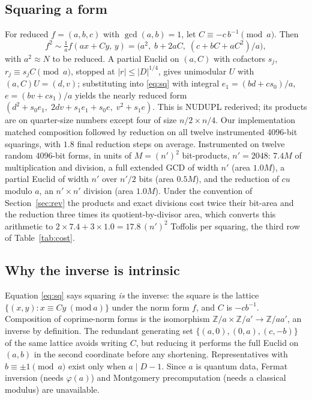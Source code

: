 \documentclass[runningheads]{llncs}
\newcommand{\Z}{\mathbb{Z}}
\begin{document}
\subsection{Squaring a form}
For reduced $f=(a,b,c)$ with $\gcd(a,b)=1$, let $C\equiv-c\,b^{-1}\pmod a$. Then
\begin{equation}\label{eq:sq}
f^2\sim\tfrac1a f(ax+Cy,\,y)=\big(a^2,\;b+2aC,\;(c+bC+aC^2)/a\big),
\end{equation}
with $a^2\approx N$ to be reduced. A partial Euclid on $(a,C)$ with cofactors $s_j$, $r_j\equiv s_jC\pmod a$, stopped at $|r|\le|D|^{1/4}$, gives unimodular $U$ with $(a,C)U=(d,v)$; substituting into \eqref{eq:sq} with integral $e_1=(bd+cs_0)/a$, $e=(bv+cs_1)/a$ yields the nearly reduced form $(d^2+s_0e_1,\;2dv+s_1e_1+s_0e,\;v^2+s_1e)$. This is NUDUPL \cite{jacobson2002} rederived; its products are on quarter-size numbers except four of size $n/2\times n/4$. Our implementation matched composition followed by reduction on all twelve instrumented 4096-bit squarings, with $1.8$ final reduction steps on average. Instrumented on twelve random 4096-bit forms, in units of $M=(n')^2$ bit-products, $n'=2048$: $7.4M$ of multiplication and division, a full extended GCD of width $n'$ (area $1.0M$), a partial Euclid of width $n'$ over $n'/2$ bits (area $0.5M$), and the reduction of $cu$ modulo $a$, an $n'\times n'$ division (area $1.0M$). Under the convention of Section~\ref{sec:rev} the products and exact divisions cost twice their bit-area and the reduction three times its quotient-by-divisor area, which converts this arithmetic to $2\times7.4+3\times1.0=17.8\,(n')^2$ Toffolis per squaring, the third row of Table~\ref{tab:cost}.

\subsection{Why the inverse is intrinsic}
Equation \eqref{eq:sq} says squaring \emph{is} the inverse: the square is the lattice $\{(x,y):x\equiv Cy\ (\mathrm{mod}\ a)\}$ under the norm form $f$, and $C$ is $-cb^{-1}$. Composition of coprime-norm forms is the isomorphism $\Z/a\times\Z/a'\to\Z/aa'$, an inverse by definition. The redundant generating set $\{(a,0),(0,a),(c,-b)\}$ of the same lattice avoids writing $C$, but reducing it performs the full Euclid on $(a,b)$ in the second coordinate before any shortening. Representatives with $b\equiv\pm1\pmod a$ exist only when $a\mid D-1$. Since $a$ is quantum data, Fermat inversion (needs $\varphi(a)$) and Montgomery precomputation (needs a classical modulus) are unavailable.
\end{document}
